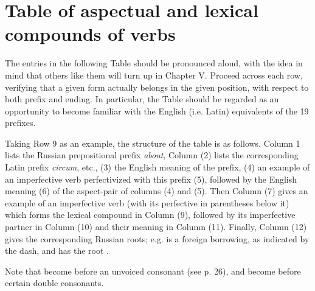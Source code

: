 \section{Table of aspectual and lexical compounds of verbs}

The entries in the following Table should be pronounced aloud, with the idea in mind that others like them will turn up in Chapter V. Proceed across each row, verifying that a given form actually belongs in the given position, with respect to both prefix and ending. In particular, the Table should be regarded as an opportunity to become familiar with the English (i.e. Latin) equivalents of the 19 prefixes.

Taking Row 9 as an example, the structure of the table is as follows. Column 1 lists the Russian prepositional prefix  \emph{about}, Column (2) lists the corresponding Latin prefix \emph{circum}, etc., (3) the English meaning of the prefix, (4) an example of an imperfective verb  perfectivized with this prefix (5), followed by the English meaning (6) of the aspect-pair of columns (4) and (5). Then Column (7) gives an example of an imperfective verb  (with its perfective  in parentheses below it) which forms the lexical compound  in Column (9), followed by its imperfective partner  in Column (10) and their meaning in Column (11). Finally, Column (12) gives the corresponding Russian roots; e.g.  is a foreign borrowing, as indicated by the dash, and  has the root .

Note that  become  before an unvoiced consonant (see p. 26), and  become  before certain double consonants.

